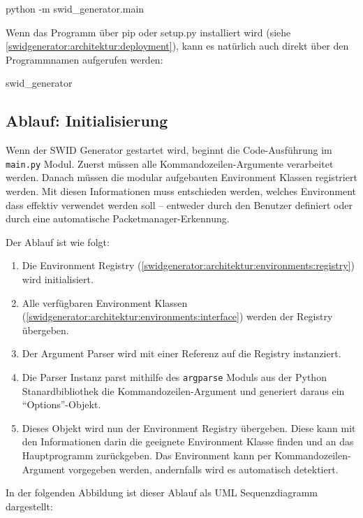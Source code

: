 \begin{bashcode}
python -m swid_generator.main
\end{bashcode}

Wenn das Programm über pip oder setup.py installiert wird (siehe
\autoref{swidgenerator:architektur:deployment}), kann es natürlich auch direkt
über den Programmnamen aufgerufen werden:

\begin{bashcode}
swid_generator
\end{bashcode}

\subsection{Ablauf: Initialisierung}
\label{swidgenerator:architektur:initialisierung}

Wenn der SWID Generator gestartet wird, beginnt die Code-Ausführung im
\texttt{main.py} Modul. Zuerst müssen alle Kommandozeilen-Argumente verarbeitet
werden. Danach müssen die modular aufgebauten Environment Klassen registriert
werden. Mit diesen Informationen muss entschieden werden, welches Environment
dass effektiv verwendet werden soll -- entweder durch den Benutzer definiert
oder durch eine automatische Packetmanager-Erkennung.

Der Ablauf ist wie folgt:

\begin{enumerate}
	\item Die Environment Registry
		(\ref{swidgenerator:architektur:environments:registry}) wird initialisiert.
	\item Alle verfügbaren Environment Klassen
		(\ref{swidgenerator:architektur:environments:interface}) werden der Registry
		übergeben.
	\item Der Argument Parser wird mit einer Referenz auf die Registry instanziert.
	\item Die Parser Instanz parst mithilfe des \texttt{argparse} Moduls aus der
		Python Stanardbibliothek die Kommandozeilen-Argument und generiert daraus ein
		\enquote{Options}-Objekt.  \item Dieses Objekt wird nun der Environment Registry
		übergeben. Diese kann mit den Informationen darin die geeignete Environment
		Klasse finden und an das Hauptprogramm zurückgeben. Das Environment kann per
		Kommandozeilen-Argument vorgegeben werden, andernfalls wird es automatisch
		detektiert.
\end{enumerate}

In der folgenden Abbildung ist dieser Ablauf als UML Sequenzdiagramm
dargestellt:

